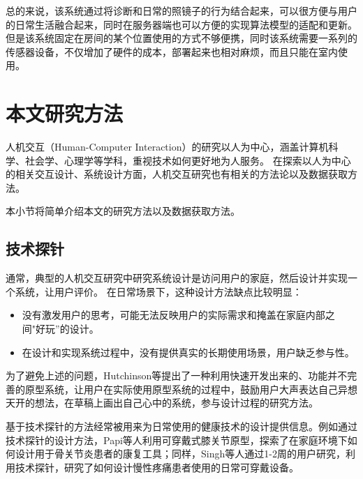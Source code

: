 总的来说，该系统通过将诊断和日常的照镜子的行为结合起来，可以很方便与用户的日常生活融合起来，同时在服务器端也可以方便的实现算法模型的适配和更新。
但是该系统固定在房间的某个位置使用的方式不够便携，同时该系统需要一系列的传感器设备，不仅增加了硬件的成本，部署起来也相对麻烦，而且只能在室内使用。


\section{本文研究方法}

人机交互（Human-Computer Interaction）的研究以人为中心，涵盖计算机科学、社会学、心理学等学科，重视技术如何更好地为人服务\cite{lazar2017research}。
在探索以人为中心的相关交互设计、系统设计方面，人机交互研究也有相关的方法论以及数据获取方法\cite{lazar2017research}。

本小节将简单介绍本文的研究方法以及数据获取方法。


\subsection{技术探针}

通常，典型的人机交互研究中研究系统设计是访问用户的家庭，然后设计并实现一个系统，让用户评价。
在日常场景下，这种设计方法缺点比较明显\cite{Hutchinson2003Technology}：

\begin{itemize}
    \item 没有激发用户的思考，可能无法反映用户的实际需求和掩盖在家庭内部之间"好玩”的设计。
    \item 在设计和实现系统过程中，没有提供真实的长期使用场景，用户缺乏参与性。  
\end{itemize}


为了避免上述的问题，Hutchinson等\cite{Hutchinson2003Technology}提出了一种利用快速开发出来的、功能并不完善的原型系统，让用户在实际使用原型系统的过程中，鼓励用户大声表达自己异想天开的想法，在草稿上画出自己心中的系统，参与设计过程的研究方法。

基于技术探针的方法经常被用来为日常使用的健康技术的设计提供信息。例如通过技术探针的设计方法，Papi等人\cite{papi2015knee}利用可穿戴式膝关节原型，探索了在家庭环境下如何设计用于骨关节炎患者的康复工具；同样，Singh等人\cite{singh2017supporting}通过1-2周的用户研究，利用技术探针，研究了如何设计慢性疼痛患者使用的日常可穿戴设备。


